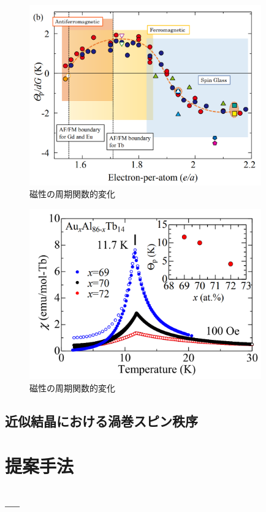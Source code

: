 \documentclass[11pt,a4j]{jreport}
\begin{document}
\begin{figure}[htbp]
  \centering
  \vspace{10mm}
  \includegraphics[width=100mm]{./figure/e_a.png}
  \caption{磁性の周期関数的変化}
  \label{e_a}
\end{figure}
\begin{figure}[htbp]
  \centering
  \vspace{10mm}
  \includegraphics[width=100mm]{./figure/qi.png}
  \caption{磁性の周期関数的変化}
  \label{χ}
\end{figure}

\section{近似結晶における渦巻スピン秩序}

\chapter{提案手法}
\section{---}
\end{document}
